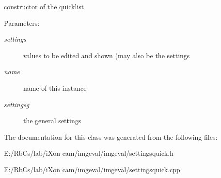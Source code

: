 constructor of the quicklist \begin{Desc}
\item[Parameters:]
\begin{description}
\item[{\em settings}]values to be edited and shown (may also be the settings \item[{\em name}]name of this instance \item[{\em settingsg}]the general settings \item[{\em }]\end{description}
\end{Desc}


The documentation for this class was generated from the following files:\begin{CompactItemize}
\item 
E:/RbCs/lab/iXon cam/imgeval/imgeval/settingsquick.h\item 
E:/RbCs/lab/iXon cam/imgeval/imgeval/settingsquick.cpp\end{CompactItemize}
